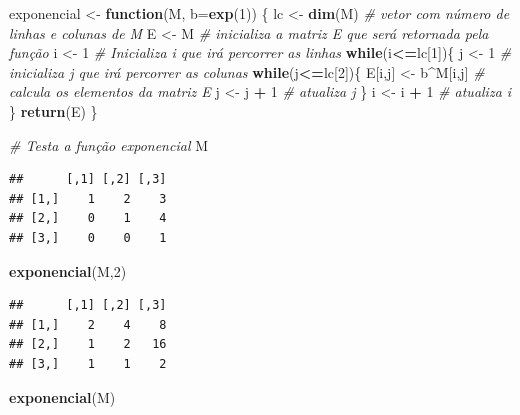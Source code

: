 \documentclass[
]{book}
\newenvironment{Shaded}{\begin{snugshade}}{\end{snugshade}}
\newcommand{\AttributeTok}[1]{\textcolor[rgb]{0.13,0.29,0.53}{#1}}
\newcommand{\CommentTok}[1]{\textcolor[rgb]{0.56,0.35,0.01}{\textit{#1}}}
\newcommand{\ControlFlowTok}[1]{\textcolor[rgb]{0.13,0.29,0.53}{\textbf{#1}}}
\newcommand{\DecValTok}[1]{\textcolor[rgb]{0.00,0.00,0.81}{#1}}
\newcommand{\FunctionTok}[1]{\textcolor[rgb]{0.13,0.29,0.53}{\textbf{#1}}}
\newcommand{\NormalTok}[1]{#1}
\newcommand{\OtherTok}[1]{\textcolor[rgb]{0.56,0.35,0.01}{#1}}
\newcommand{\SpecialCharTok}[1]{\textcolor[rgb]{0.81,0.36,0.00}{\textbf{#1}}}
\begin{document}
\begin{Shaded}
\begin{Highlighting}[]
\NormalTok{exponencial }\OtherTok{\textless{}{-}} \ControlFlowTok{function}\NormalTok{(M, }\AttributeTok{b=}\FunctionTok{exp}\NormalTok{(}\DecValTok{1}\NormalTok{)) \{}
\NormalTok{  lc }\OtherTok{\textless{}{-}} \FunctionTok{dim}\NormalTok{(M) }\CommentTok{\# vetor com número de linhas e colunas de M}
\NormalTok{  E }\OtherTok{\textless{}{-}}\NormalTok{ M }\CommentTok{\# inicializa a matriz E que será retornada pela função}
\NormalTok{  i }\OtherTok{\textless{}{-}} \DecValTok{1} \CommentTok{\# Inicializa i que irá percorrer as linhas}
  \ControlFlowTok{while}\NormalTok{(i}\SpecialCharTok{\textless{}=}\NormalTok{lc[}\DecValTok{1}\NormalTok{])\{}
\NormalTok{    j }\OtherTok{\textless{}{-}} \DecValTok{1} \CommentTok{\# inicializa j que irá percorrer as colunas}
    \ControlFlowTok{while}\NormalTok{(j}\SpecialCharTok{\textless{}=}\NormalTok{lc[}\DecValTok{2}\NormalTok{])\{}
\NormalTok{      E[i,j] }\OtherTok{\textless{}{-}}\NormalTok{ b}\SpecialCharTok{\^{}}\NormalTok{M[i,j] }\CommentTok{\# calcula os elementos da matriz E}
\NormalTok{      j }\OtherTok{\textless{}{-}}\NormalTok{ j }\SpecialCharTok{+} \DecValTok{1} \CommentTok{\# atualiza j}
\NormalTok{    \}}
\NormalTok{    i }\OtherTok{\textless{}{-}}\NormalTok{ i }\SpecialCharTok{+} \DecValTok{1} \CommentTok{\# atualiza i}
\NormalTok{  \}}
  \FunctionTok{return}\NormalTok{(E)}
\NormalTok{\}}

\CommentTok{\# Testa a função \textquotesingle{}exponencial\textquotesingle{}}
\NormalTok{M}
\end{Highlighting}
\end{Shaded}

\begin{verbatim}
##      [,1] [,2] [,3]
## [1,]    1    2    3
## [2,]    0    1    4
## [3,]    0    0    1
\end{verbatim}

\begin{Shaded}
\begin{Highlighting}[]
\FunctionTok{exponencial}\NormalTok{(M,}\DecValTok{2}\NormalTok{)  }
\end{Highlighting}
\end{Shaded}

\begin{verbatim}
##      [,1] [,2] [,3]
## [1,]    2    4    8
## [2,]    1    2   16
## [3,]    1    1    2
\end{verbatim}

\begin{Shaded}
\begin{Highlighting}[]
\FunctionTok{exponencial}\NormalTok{(M)}
\end{Highlighting}
\end{Shaded}
\end{document}

